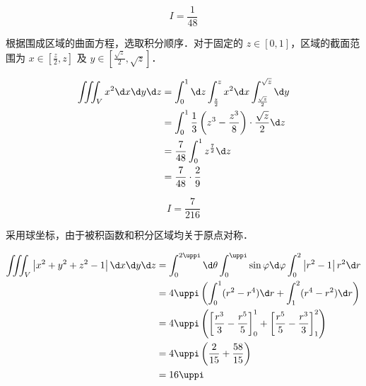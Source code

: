 \begin{solution}
    \begin{equation}
        I = \boxed{\frac{1}{48}}
    \end{equation}

    根据围成区域的曲面方程，选取积分顺序．对于固定的 $z \in [0, 1]$，区域的截面范围为 $x \in [\frac{z}{2}, z]$ 及 $y \in [\frac{\sqrt{z}}{2}, \sqrt{z}]$．

    \begin{equation}
        \begin{aligned}
            \iiint_{V} x^{2} \d x \d y \d z & = \int_{0}^{1} \d z \int_{\frac{z}{2}}^{z} x^2 \d x \int_{\frac{\sqrt{z}}{2}}^{\sqrt{z}} \d y \\
                                            & = \int_{0}^{1} \frac{1}{3} \left( z^3 - \frac{z^3}{8} \right) \cdot \frac{\sqrt{z}}{2} \d z   \\
                                            & = \frac{7}{48} \int_{0}^{1} z^{\frac{7}{2}} \d z                                              \\
                                            & = \frac{7}{48} \cdot \frac{2}{9} \label{eq:I5}
        \end{aligned}
    \end{equation}

    \begin{equation}
        I = \boxed{\frac{7}{216}}
    \end{equation}

    采用球坐标，由于被积函数和积分区域均关于原点对称．

    \begin{equation}
        \begin{aligned}
            \iiint_{V}\left|x^{2}+y^{2}+z^{2}-1\right| \d x \d y \d z & = \int_{0}^{2 \uppi} \d \theta \int_{0}^{\uppi} \sin \varphi \d \varphi \int_{0}^{2} \left| r^2 - 1 \right| r^2 \d r                 \\
                                                                      & = 4 \uppi \left( \int_{0}^{1} (r^2-r^4) \d r + \int_{1}^{2} (r^4-r^2) \d r \right)                                                   \\
                                                                      & = 4 \uppi \left( \left[ \frac{r^3}{3} - \frac{r^5}{5} \right]_{0}^{1} + \left[ \frac{r^5}{5} - \frac{r^3}{3} \right]_{1}^{2} \right) \\
                                                                      & = 4 \uppi \left( \frac{2}{15} + \frac{58}{15} \right)                                                                                \\
                                                                      & = 16 \uppi \label{eq:I6}
        \end{aligned}
    \end{equation}


\end{solution}

